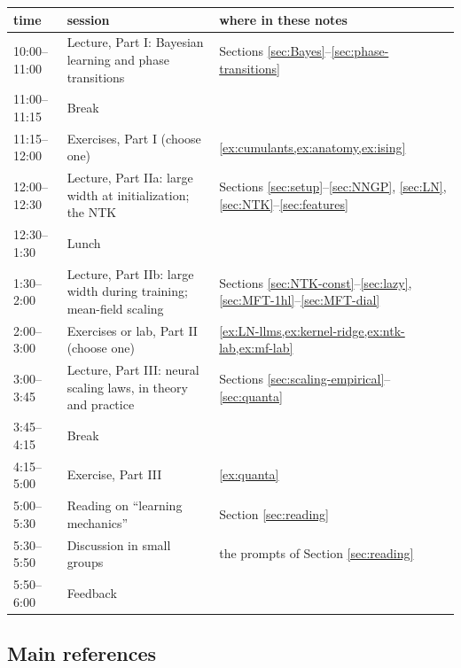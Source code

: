 \documentclass[11pt]{article}
\begin{document}
\begin{center}
\small
\renewcommand{\arraystretch}{1.25}
\begin{tabular}{l|p{6.4cm}|p{4.4cm}}
    \textbf{time} & \textbf{session} & \textbf{where in these notes} \\\hline
    10:00--11:00 & Lecture, Part I: Bayesian learning and phase transitions & Sections \ref{sec:Bayes}--\ref{sec:phase-transitions} \\
    11:00--11:15 & Break & \\
    11:15--12:00 & Exercises, Part I (choose one) & \cref{ex:cumulants,ex:anatomy,ex:ising} \\
    12:00--12:30 & Lecture, Part IIa: large width at initialization; the NTK & Sections \ref{sec:setup}--\ref{sec:NNGP}, \ref{sec:LN}, \ref{sec:NTK}--\ref{sec:features} \\
    12:30--1:30 & Lunch & \\
    1:30--2:00 & Lecture, Part IIb: large width during training; mean-field scaling & Sections \ref{sec:NTK-const}--\ref{sec:lazy}, \ref{sec:MFT-1hl}--\ref{sec:MFT-dial} \\
    2:00--3:00 & Exercises or lab, Part II (choose one) & \cref{ex:LN-llms,ex:kernel-ridge,ex:ntk-lab,ex:mf-lab} \\
    3:00--3:45 & Lecture, Part III: neural scaling laws, in theory and practice & Sections \ref{sec:scaling-empirical}--\ref{sec:quanta} \\
    3:45--4:15 & Break & \\
    4:15--5:00 & Exercise, Part III & \cref{ex:quanta} \\
    5:00--5:30 & Reading on ``learning mechanics'' & Section \ref{sec:reading} \\
    5:30--5:50 & Discussion in small groups & the prompts of Section \ref{sec:reading} \\
    5:50--6:00 & Feedback & \\
\end{tabular}
\end{center}

\subsection{Main references}
\label{sec:day-refs}
\end{document}
